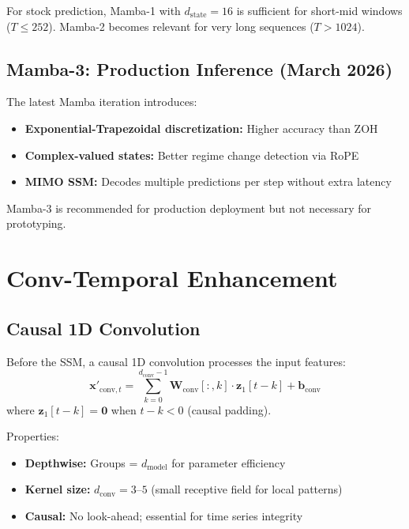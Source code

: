 \documentclass[11pt,a4paper]{article}
\begin{document}
For stock prediction, Mamba-1 with $d_{\text{state}} = 16$ is sufficient for
short-mid windows ($T \leq 252$). Mamba-2 becomes relevant for very long
sequences ($T > 1024$).

\subsection{Mamba-3: Production Inference (March 2026)}

The latest Mamba iteration introduces:
\begin{itemize}
  \item \textbf{Exponential-Trapezoidal discretization:} Higher accuracy than ZOH
  \item \textbf{Complex-valued states:} Better regime change detection via RoPE
  \item \textbf{MIMO SSM:} Decodes multiple predictions per step without extra latency
\end{itemize}
Mamba-3 is recommended for production deployment but not necessary for prototyping.

\section{Conv-Temporal Enhancement}

\subsection{Causal 1D Convolution}

Before the SSM, a causal 1D convolution processes the input features:
\[
\mathbf{x}'_{\text{conv},t} = \sum_{k=0}^{d_{\text{conv}}-1} \mathbf{W}_{\text{conv}}[:,k] \cdot \mathbf{z}_1[t-k] + \mathbf{b}_{\text{conv}}
\]
where $\mathbf{z}_1[t - k] = \mathbf{0}$ when $t - k < 0$ (causal padding).

Properties:
\begin{itemize}
  \item \textbf{Depthwise:} Groups = $d_{\text{model}}$ for parameter efficiency
  \item \textbf{Kernel size:} $d_{\text{conv}} = 3$--$5$ (small receptive field for local patterns)
  \item \textbf{Causal:} No look-ahead; essential for time series integrity
\end{itemize}
\end{document}
